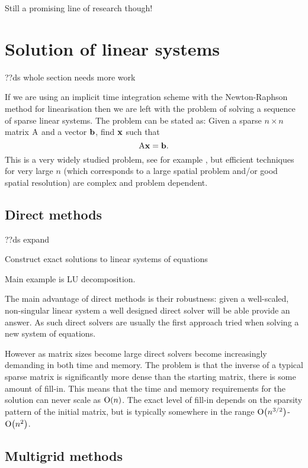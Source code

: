 Still a promising line of research though!



\section{Solution of linear systems}
\label{sec:solution-lin-sys}

??ds whole section needs more work

If we are using an implicit time integration scheme with the Newton-Raphson method for linearisation then we are left with the problem of solving a sequence of sparse linear systems.
The problem can be stated as: Given a sparse $n \times n $ matrix $\mathrm{A}$ and a vector ${\mathbf{b}}$, find $\mathbf{x}$ such that
\begin{equation}
  \label{eq:linear-system}
  \mathrm{A} \mathbf{x} = {\mathbf{b}}.
\end{equation}
This is a very widely studied problem, see for example \cite{Saad2000}, but efficient techniques for very large $n$ (which corresponds to a large spatial problem and/or good spatial resolution) are complex and problem dependent.


\subsection{Direct methods}
\label{sec:direct-methods}

??ds expand

Construct exact solutions to linear systems of equations

Main example is LU decomposition.

The main advantage of direct methods is their robustness: given a well-scaled, non-singular linear system a well designed direct solver will be able provide an answer.
As such direct solvers are usually the first approach tried when solving a new system of equations.

However as matrix sizes become large direct solvers become increasingly demanding in both time and memory.
The problem is that the inverse of a typical sparse matrix is significantly more dense than the starting matrix, \ie there is some amount of fill-in.
This means that the time and memory requirements for the solution can never scale as $\text{O}{\left( n \right)}$.
The exact level of fill-in depends on the sparsity pattern of the initial matrix, but is typically somewhere in the range $\text{O}{\left( n^{3/2} \right)}$-$\text{O}{\left( n^2 \right)}$.


\subsection{Multigrid methods}

